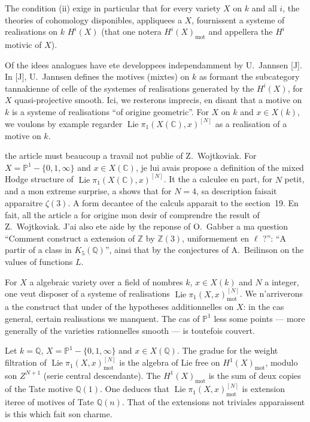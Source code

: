 \documentclass[12pt,a4paper]{article}
\theoremstyle{plain}
\theoremstyle{definition}
\theoremstyle{remark}
\DeclareMathOperator{\Lie}{Lie}
\newcommand{\mot}{\mathrm{mot}}
\providecommand{\mot}{\mathrm{mot}}
\providecommand{\Lie}{\operatorname{Lie}}
\begin{document}
The condition (ii) exige in particular that for every variety $X$ on $k$ and all $i$,
the theories of cohomology disponibles, appliquees a $X$, fournissent a systeme of
realisations on $k$ $H^i(X)$ (that one notera $H^i(X)_{\mot}$ and appellera the $H^i$
motivic of $X$).

Of the idees analogues have ete developpees independamment by U.~Jannsen [J].
In [J], U.~Jannsen defines the motives (mixtes) on $k$ as formant the subcategory
tannakienne of celle of the systemes of realisations generated by the $H^i(X)$, for
$X$ quasi-projective smooth. Ici, we resterons imprecis, en disant that a motive on $k$
is a systeme of realisations ``of origine geometric''. For $X$ on $k$ and
$x \in X(k)$, we voulons by example regarder $\Lie\pi_1(X(\mathbb{C}),x)^{[N]}$ as
a realisation of a motive on $k$.

the article must beaucoup a travail not publie of Z.~Wojtkoviak. For
$X = \mathbb{P}^1 - \{0,1,\infty\}$ and $x \in X(\mathbb{C})$, je lui avais propose a
definition of the mixed Hodge structure of $\Lie\pi_1(X(\mathbb{C}),x)^{[N]}$. It the a
calculee en part, for $N$ petit, and a mon extreme surprise, a shows that for $N=4$,
sa description faisait apparaitre $\zeta(3)$. A form decantee of the calculs apparait
to the section~19. En fait, all the article a for origine mon desir of comprendre the
result of Z.~Wojtkoviak. J'ai also ete aide by the reponse of O.~Gabber a ma
question ``Comment construct a extension of $\mathbb{Z}$ by $\mathbb{Z}(3)$,
uniformement en $\ell$ ?'': ``A partir of a class in $K_5(\mathbb{Q})$'', ainsi that by
the conjectures of A.~Beilinson on the values of functions $L$.

For $X$ a algebraic variety over a field of nombres $k$, $x \in X(k)$ and $N$ a
integer, one veut disposer of a systeme of realisations
$\Lie\pi_1(X,x)^{[N]}_{\mot}$. We n'arriverons a the construct that under of the hypotheses
additionnelles on $X$: in the cas general, certain realisations we manquent.
The cas of $\mathbb{P}^1$ less some points --- more generally of the varieties rationnelles
smooth --- is toutefois couvert.

Let $k = \mathbb{Q}$, $X = \mathbb{P}^1 - \{0,1,\infty\}$ and $x \in X(\mathbb{Q})$. The gradue
for the weight filtration of $\Lie\pi_1(X,x)^{[N]}_{\mot}$ is the algebra of Lie free
on $H^1(X)_{\mot}$, modulo son $Z^{N+1}$ (serie central descendante). The $H^1(X)_{\mot}$
is the sum of deux copies of the Tate motive $\mathbb{Q}(1)$. One deduces that
$\Lie\pi_1(X,x)^{[N]}_{\mot}$ is extension iteree of motives of Tate $\mathbb{Q}(n)$. That of the
extensions not triviales apparaissent is this which fait son charme.
\end{document}
